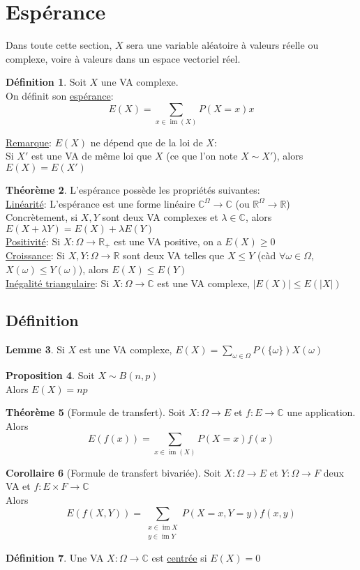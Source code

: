 \documentclass[10pt,a4paper]{article}
\theoremstyle{definition}
\newtheorem{proposition}{Proposition}[section]
\newtheorem{theorem}[proposition]{Théorème}
\newtheorem{corollaire}[proposition]{Corollaire}
\newtheorem{lemme}[proposition]{Lemme}
\newtheorem{definition}[proposition]{Définition}
\DeclareMathOperator{\im}{im}
\begin{document}
\section{Espérance}
Dans toute cette section, $X$ sera une variable aléatoire à valeurs réelle ou complexe, voire à valeurs dans un espace vectoriel réel.
\begin{definition}
Soit $X$ une VA complexe. \\
On définit son \uline{espérance}: 
\[E(X) = \sum\limits_{x \in \im(X)} P(X = x)x\]
\end{definition}
\noindent \uline{Remarque}: $E(X)$ ne dépend que de la loi de $X$: \\
Si $X'$ est une VA de même loi que $X$ (ce que l'on note $X \sim X'$), alors $E(X) = E(X')$
\begin{theorem}
L'espérance possède les propriétés suivantes: \\
\uline{Linéarité}: L'espérance est une forme linéaire $\mathbb{C}^\Omega \to \mathbb{C}$ (ou $\mathbb{R}^\Omega \to \mathbb{R}$) \\
Concrètement, si $X, Y$ sont deux VA complexes et $\lambda \in \mathbb{C}$, alors $E(X + \lambda Y) = E(X) + \lambda E(Y)$ \\
\uline{Positivité}: Si $X: \Omega \to \mathbb{R}_+$ est une VA positive, on a $E(X) \geq 0$ \\
\uline{Croissance}: Si $X, Y: \Omega \to \mathbb{R}$ sont deux VA telles que $X \leq Y$ (càd $\forall \omega \in \Omega$, $X(\omega) \leq Y(\omega)$), alors $E(X) \leq E(Y)$ \\
\uline{Inégalité triangulaire}: Si $X: \Omega \to \mathbb{C}$ est une VA complexe, $|E(X)| \leq E(|X|)$
\end{theorem}
\subsection{Définition}
\begin{lemme}
Si $X$ est une VA complexe, $E(X) = \sum\limits_{\omega \in \Omega} P(\{\omega\})X(\omega)$
\end{lemme}
\begin{proposition}
Soit $X \sim B(n, p)$ \\
Alors $E(X) = np$
\end{proposition}
\begin{theorem}[Formule de transfert]
Soit $X: \Omega \to E$ et $f:E \to \mathbb{C}$ une application. \\
Alors
\[E(f(x)) = \sum\limits_{x \in \im(X)}P(X = x)f(x)\]
\end{theorem}
\begin{corollaire}[Formule de transfert bivariée]
Soit $X: \Omega \to E$ et $Y: \Omega \to F$ deux VA et $f: E \times F \to \mathbb{C}$ \\
Alors
\[E(f(X, Y)) = \sum\limits_{\substack{x \in \im X \\ y \in \im Y}} P(X = x, Y = y)f(x, y) \]
\end{corollaire}
\begin{definition}
Une VA $X: \Omega \to \mathbb{C}$ est \uline{centrée} si $E(X) = 0$
\end{definition}
\end{document}
